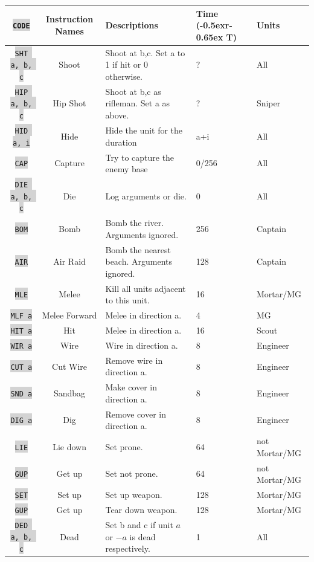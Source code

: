 \documentclass{article}
\newcommand{\vnscode}[1]{\colorbox{lightgray}{\lstinline[language=vns]{#1}}}
\newcommand{\RT}{\lower-0.5ex\hbox{r}\kern-0.65ex T}
\begin{document}
\begin{minipage}{\textwidth}
\label{table:combat}
\centering
\begin{tabular}{|c|c|l|l|l|}
    \hline \vnscode{CODE} & Instruction Names & Descriptions & Time (\RT) & Units \\ \hline
    \vnscode{SHT a, b, c} & Shoot & Shoot at b,c. Set a to 1 if hit or 0 otherwise. & ? & All \\ \hline
    \vnscode{HIP a, b, c} & Hip Shot & Shoot at b,c as rifleman. Set a as above. & ? & Sniper \\ \hline
    \vnscode{HID a, i} & Hide & Hide the unit for the duration & a+i & All \\ \hline
    \vnscode{CAP} & Capture & Try to capture the enemy base & 0/256 & All \\ \hline
    \vnscode{DIE a, b, c} & Die & Log arguments or die. & 0 & All \\ \hline
    \vnscode{BOM} & Bomb & Bomb the river. Arguments ignored. & 256 & Captain \\ \hline
    \vnscode{AIR} & Air Raid & Bomb the nearest beach. Arguments ignored. & 128 & Captain \\ \hline
    \vnscode{MLE} & Melee & Kill all units adjacent to this unit. & 16 & Mortar/MG \\ \hline
    \vnscode{MLF a} & Melee Forward & Melee in direction a. & 4 & MG \\ \hline
    \vnscode{HIT a} & Hit & Melee in direction a. & 16 & Scout \\ \hline
    \vnscode{WIR a} & Wire & Wire in direction a. & 8 & Engineer \\ \hline
    \vnscode{CUT a} & Cut Wire & Remove wire in direction a. & 8 & Engineer \\ \hline
    \vnscode{SND a} & Sandbag & Make cover in direction a. & 8 & Engineer \\ \hline
    \vnscode{DIG a} & Dig & Remove cover in direction a. & 8 & Engineer \\ \hline
    \vnscode{LIE} & Lie down & Set prone. & 64 & not Mortar/MG \\ \hline
    \vnscode{GUP} & Get up & Set not prone. & 64 & not Mortar/MG \\ \hline
    \vnscode{SET} & Set up & Set up weapon. & 128 & Mortar/MG \\ \hline
    \vnscode{GUP} & Get up & Tear down weapon. & 128 & Mortar/MG \\ \hline
    \vnscode{DED a, b, c} & Dead & Set b and c if unit $a$ or $-a$ is dead respectively. & 1 & All \\ \hline
\end{tabular}
\end{minipage}
\end{document}
